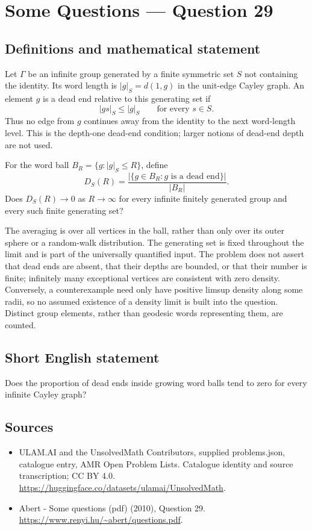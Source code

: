 \documentclass[11pt,a4paper]{article}
\begin{document}
\section*{Some Questions — Question 29}\label{statement}

\subsection{Definitions and mathematical statement}
Let $\Gamma$ be an infinite group generated by a finite symmetric set $S$ not containing the identity. Its word length is $|g|_S=d(1,g)$ in the unit-edge Cayley graph. An element $g$ is a dead end relative to this generating set if
\[
 |gs|_S\leq |g|_S\qquad\text{for every }s\in S.
\]
Thus no edge from $g$ continues away from the identity to the next word-length level. This is the depth-one dead-end condition; larger notions of dead-end depth are not used.

For the word ball $B_R=\{g:|g|_S\leq R\}$, define
\[
 D_S(R)=\frac{|\{g\in B_R:g\text{ is a dead end}\}|}{|B_R|}.
\]
Does $D_S(R)\to0$ as $R\to\infty$ for every infinite finitely generated group and every such finite generating set?

The averaging is over all vertices in the ball, rather than only over its outer sphere or a random-walk distribution. The generating set is fixed throughout the limit and is part of the universally quantified input. The problem does not assert that dead ends are absent, that their depths are bounded, or that their number is finite; infinitely many exceptional vertices are consistent with zero density. Conversely, a counterexample need only have positive limsup density along some radii, so no assumed existence of a density limit is built into the question. Distinct group elements, rather than geodesic words representing them, are counted.
\subsection{Short English statement}
Does the proportion of dead ends inside growing word balls tend to zero for every infinite Cayley graph?
\subsection{Sources}
\begin{itemize}
\item[S1] ULAM.AI and the UnsolvedMath Contributors, supplied problems.json, catalogue entry, AMR Open Problem Lists. Catalogue identity and source transcription; CC BY 4.0.
\url{https://huggingface.co/datasets/ulamai/UnsolvedMath}.
\item[S2] Abert - Some questions (pdf) (2010), Question 29. 
\url{https://www.renyi.hu/~abert/questions.pdf}.
\end{itemize}
\end{document}
